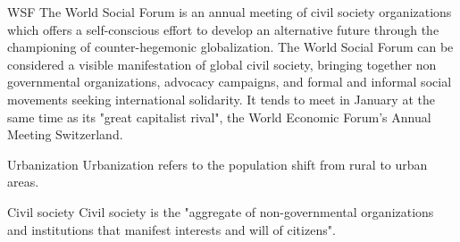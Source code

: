 \begin{sortEnvironment}{WSF}
The World Social Forum is an annual meeting of civil society organizations which offers a self-conscious effort to develop an alternative future through the championing of counter-hegemonic globalization. The World Social Forum can be considered a visible manifestation of global civil society, bringing together non governmental organizations, advocacy campaigns, and formal and informal social movements seeking international solidarity. It tends to meet in January at the same time as its "great capitalist rival", the World Economic Forum's Annual Meeting Switzerland. 
\end{sortEnvironment}

\begin{sortEnvironment}{Urbanization}
Urbanization refers to the population shift from rural to urban areas.
\end{sortEnvironment}

\begin{sortEnvironment}{Civil society}
Civil society is the "aggregate of non-governmental organizations and institutions that manifest interests and will of citizens".
\end{sortEnvironment}